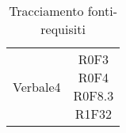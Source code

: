 \begin{center}
\begin{longtable}{|c|c|}
\hline
Verbale4 & \parbox[t]{\dimFonti}{R0F3 \\R0F4 \\R0F8.3 \\R1F32 \\}\\  
\hline
\caption{Tracciamento fonti-requisiti}
\end{longtable}
\end{center}
